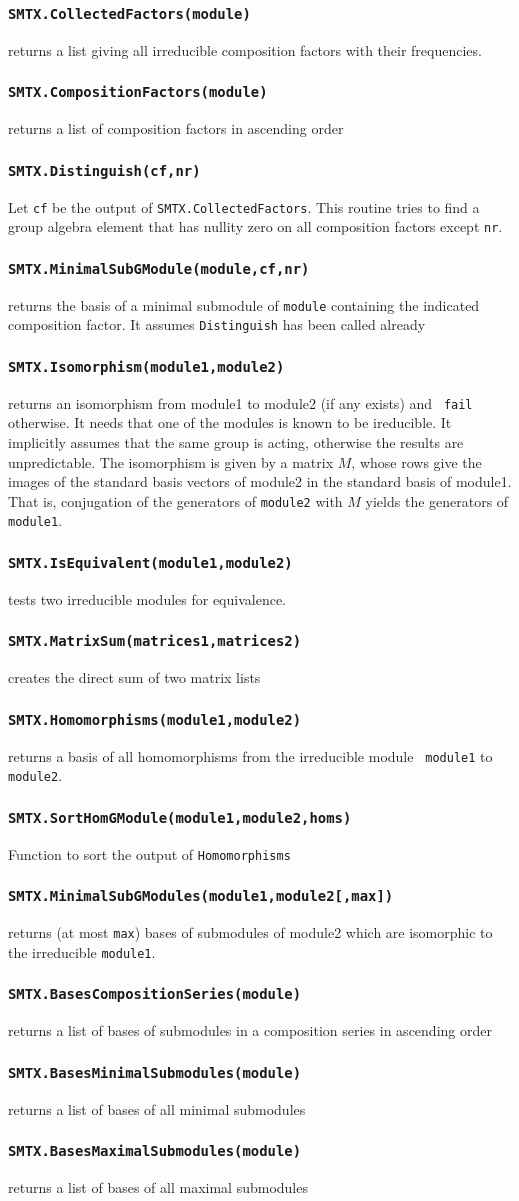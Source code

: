\documentclass[12pt]{article}
\def\smtxcmd#1{\subsubsection*{{\tt #1}}}
\begin{document}
\smtxcmd{SMTX.CollectedFactors(module)}
returns a list giving all irreducible composition factors with their
frequencies.

\smtxcmd{SMTX.CompositionFactors(module)}
returns a list of composition factors in ascending order

\smtxcmd{SMTX.Distinguish(cf,nr)}
Let {\tt cf} be the output of {\tt SMTX.CollectedFactors}. This routine
tries to find a group algebra element that has nullity zero on all
composition factors except {\tt nr}.

\smtxcmd{SMTX.MinimalSubGModule(module,cf,nr)}
returns the basis of a minimal submodule of {\tt module} containing the
indicated composition factor. It assumes {\tt Distinguish} has been called
already

\smtxcmd{SMTX.Isomorphism(module1,module2)}
returns an isomorphism from module1 to module2 (if any exists) and {\tt
fail} otherwise. It needs that one of the modules is known to be
ireducible. It implicitly assumes that the same group is acting, otherwise
the results are unpredictable.
The isomorphism is given by a matrix $M$, whose rows give the images of the
standard basis vectors of module2 in the standard basis of module1. That is,
conjugation of the generators of {\tt module2} with $M$ yields the
generators of {\tt module1}.

\smtxcmd{SMTX.IsEquivalent(module1,module2)}
tests two irreducible modules for equivalence.

\smtxcmd{SMTX.MatrixSum(matrices1,matrices2)}
creates the direct sum of two matrix lists

\smtxcmd{SMTX.Homomorphisms(module1,module2)}
returns a basis of all homomorphisms from the irreducible module {\tt
module1} to {\tt module2}.

\smtxcmd{SMTX.SortHomGModule(module1,module2,homs)}
Function to sort the output of {\tt Homomorphisms}

\smtxcmd{SMTX.MinimalSubGModules(module1,module2[,max])}
returns (at most {\tt max}) bases of submodules of module2 which are
isomorphic to the irreducible {\tt module1}.

\smtxcmd{SMTX.BasesCompositionSeries(module)}
returns a list of bases of submodules in a composition series in ascending
order

\smtxcmd{SMTX.BasesMinimalSubmodules(module)}
returns a list of bases of all minimal submodules

\smtxcmd{SMTX.BasesMaximalSubmodules(module)}
returns a list of bases of all maximal submodules
\end{document}
